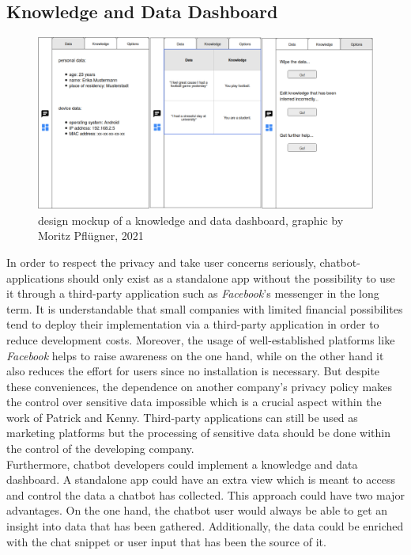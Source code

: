 \documentclass[sigconf, nonacm]{acmart}
\begin{document}
\subsection{Knowledge and Data Dashboard}
\label{sec:four_one}
\begin{figure}[h]
  \includegraphics[width=\textwidth]{kddb}
  \caption{design mockup of a knowledge and data dashboard, graphic by Moritz Pflügner, 2021}
  \label{fig:kddb}
\end{figure}
In order to respect the privacy and take user concerns seriously, chatbot-applications should only exist as a standalone app without the possibility to use it through a third-party application such as \emph{Facebook}'s messenger in the long term. It is understandable that small companies with limited
financial possibilites tend to deploy their implementation via a third-party application in order to reduce development costs. Moreover, the usage of well-established platforms like \emph{Facebook} helps to raise awareness on the one hand, while on the other hand it also reduces the effort for users since no installation is necessary. 
But despite these conveniences, the dependence on another company's privacy policy makes the control over sensitive data impossible which is a crucial aspect within the 
work of Patrick and Kenny\cite{Patrick2003}. Third-party applications can still be used as marketing platforms but the processing of sensitive data should be done within the control of the developing company.
\\
Furthermore, chatbot developers could implement a knowledge and data dashboard. A standalone app could have an extra view which is meant to access and control the data a chatbot has collected.
This approach could have two major advantages. On the one hand, the chatbot user would always be able to get an insight into data that has been gathered. Additionally, the data could be enriched with the chat snippet or user input that has been the source of it. 
\end{document}
